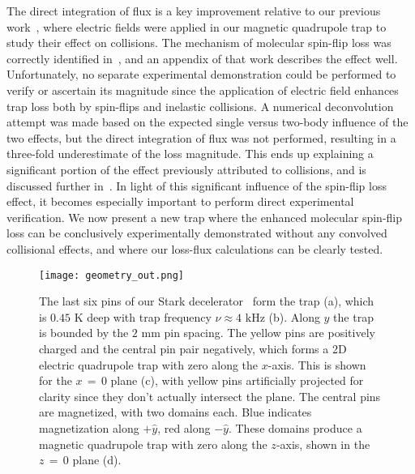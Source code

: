 \documentclass[%
 reprint,
 amsmath,amssymb,
 aps,
prl,
]{revtex4-1}
\begin{document}
The direct integration of flux is a key improvement relative to our previous work~\cite{Stuhl2013}, where electric fields were applied in our magnetic quadrupole trap to study their effect on collisions.
The mechanism of molecular spin-flip loss was correctly identified in~\cite{Stuhl2013}, and an appendix of that work describes the effect well. 
Unfortunately, no separate experimental demonstration could be performed to verify or ascertain its magnitude since the application of electric field enhances trap loss both by spin-flips and inelastic collisions.
A numerical deconvolution attempt was made based on the expected single versus two-body influence of the two effects, but the direct integration of flux was not performed, resulting in a three-fold underestimate of the loss magnitude.
This ends up explaining a significant portion of the effect previously attributed to collisions, and is discussed further in~\cite{ssm}.
In light of this significant influence of the spin-flip loss effect, it becomes especially important to perform direct experimental verification.
We now present a new trap where the enhanced molecular spin-flip loss can be conclusively experimentally demonstrated without any convolved collisional effects, and where our loss-flux calculations can be clearly tested.





\begin{figure}[tb]
\texttt{[image: geometry\_out.png]}%
\caption{
The last six pins of our Stark decelerator~\cite{Sawyer2008} form the trap (a), which is $0.45\text{ K}$ deep with trap frequency $\nu\approx4\text{ kHz}$ (b). 
Along $y$ the trap is bounded by the $2\text{ mm}$ pin spacing. 
The yellow pins are positively charged and the central pin pair negatively, which forms a 2D electric quadrupole trap with zero along the $x$-axis. 
This is shown for the $x\,{=}\,0$ plane (c), with yellow pins artificially projected for clarity since they don't actually intersect the plane. 
The central pins are magnetized, with two domains each. 
Blue indicates magnetization along $+\hat{y}$, red along $-\hat{y}$. 
These domains produce a magnetic quadrupole trap with zero along the $z$-axis, shown in the $z\,{=}\,0$ plane (d). 
\label{fig:CAD}}
\end{figure}

\end{document}
